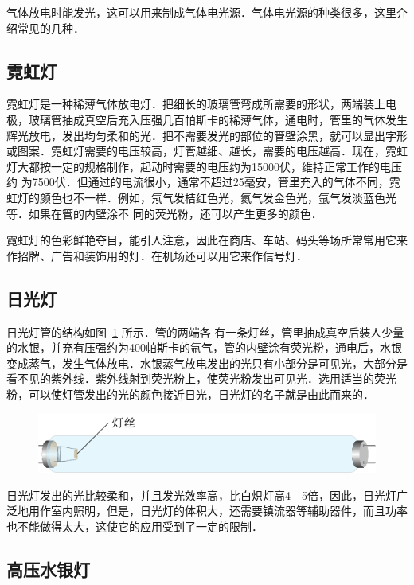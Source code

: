 气体放电时能发光，这可以用来制成气体电光源．气体电光源的种类很多，这里介绍常见的几种．

\subsection{霓虹灯}


霓虹灯是一种稀薄气体放电灯．把细长的玻璃管弯成所需要的形状，两端装上电极，玻璃管抽成真空后充入压强几百帕斯卡的稀薄气体，通电时，管里的气体发生辉光放电，发出均匀柔和的光．把不需要发光的部位的管壁涂黑，就可以显出字形或图案．霓虹灯需要的电压较高，灯管越细、越长，需要的电压越高．现在，霓虹灯大都按一定的规格制作，起动时需要的电压约为15000伏，维持正常工作的电压约
为7500伏．但通过的电流很小，通常不超过25毫安，管里充入的气体不同，霓虹灯的颜色也不一样．例如，氖气发桔红色光，氦气发金色光，氩气发淡蓝色光等．如果在管的内壁涂不
同的荧光粉，还可以产生更多的颜色．

霓虹灯的色彩鲜艳夺目，能引人注意，因此在商店、车站、码头等场所常常用它来作招牌、广告和装饰用的灯．在机场还可以用它来作信号灯．

\subsection{日光灯}
日光灯管的结构如图~\ref{fig_B_8-12} 所示．管的两端各
有一条灯丝，管里抽成真空后装人少量的水银，并充有压强约为400帕斯卡的氩气，管的内壁涂有荧光粉，通电后，水银变成蒸气，发生气体放电．水银蒸气放电发出的光只有小部分是可见光，大部分是看不见的紫外线．紫外线射到荧光粉上，使荧光粉发出可见光．选用适当的荧光粉，可以使灯管发出的光的颜色接近日光，日光灯的名子就是由此而来的．
\begin{figure}[htbp]
    \centering
    \includegraphics{fig/B/8-12.pdf}
    \caption{}\label{fig_B_8-12}
\end{figure}

日光灯发出的光比较柔和，并且发光效率高，比白炽灯高4—5倍，因此，日光灯广泛地用作室内照明，但是，日光灯的体积大，还需要镇流器等辅助器件，而且功率也不能做得太大，这使它的应用受到了一定的限制．

\subsection{高压水银灯}

